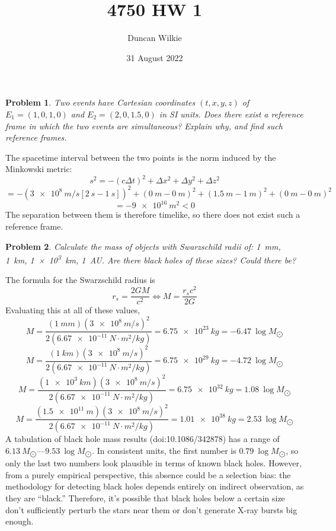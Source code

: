 \documentclass{article}
\title{4750 HW 1}
\author{Duncan Wilkie}
\date{31 August 2022}
\newtheorem{prob}{Problem}
\begin{document}
\maketitle

\begin{prob}
  Two events have Cartesian coordinates $(t,x,y,z)$ of $E_{1}=(1, 0, 1, 0)$ and $E_{2}=(2, 0, 1.5, 0)$ in SI units.
  Does there exist a reference frame in which the two events are simultaneous?
  Explain why, and find such reference frames.
\end{prob}

The spacetime interval between the two points is the norm induced by the Minkowski metric:
\[
  s^{2}= -(c\Delta t)^{2}+\Delta x^{2} + \Delta y^{2} + \Delta z^{2}
\]
\[
  =-(\SI{3e8}{m/s}[\SI{2}{s}-\SI{1}{s}])^{2}+(\SI{0}{m}-\SI{0}{m})^{2}+(\SI{1.5}{m}-\SI{1}{m})^{2}+(\SI{0}{m}-\SI{0}{m})^{2}
\]
\[
  =\SI{-9e16}{m^{2}} < 0
\]
The separation between them is therefore timelike, so there does not exist such a reference frame.

\begin{prob}
  Calculate the mass of objects with Swarzschild radii of: \SI{1}{mm}, \SI{1}{km}, \SI{1e3}{km}, \SI{1}{AU}.
  Are there black holes of these sizes?
  Could there be?

\end{prob}
The formula for the Swarzschild radius is
\[
  r_{s}=\frac{2GM}{c^{2}}\Leftrightarrow M = \frac{r_{s}c^{2}}{2G}
\]
Evaluating this at all of these values,
\[
  M = \frac{(\SI{1}{mm})(\SI{3e8}{m/s})^{2}}{2(\SI{6.67e-11}{N\cdot m^{2}/kg})} = \SI{6.75e23}{kg} = \SI{-6.47}{\log M_{\bigodot}}
\]
\[
  M = \frac{(\SI{1}{km})(\SI{3e8}{m/s})^{2}}{2(\SI{6.67e-11}{N\cdot m^{2}/kg})} = \SI{6.75e29}{kg} = \SI{-4.72}{\log M_{\bigodot}}
\]
\[
  M = \frac{(\SI{1e3}{km})(\SI{3e8}{m/s})^{2}}{2(\SI{6.67e-11}{N\cdot m^{2}/kg})} = \SI{6.75e32}{kg} = \SI{1.08}{\log M_{\bigodot}}
\]
\[
  M = \frac{(\SI{1.5e11}{m})(\SI{3e8}{m/s})^{2}}{2(\SI{6.67e-11}{N\cdot m^{2}/kg})} = \SI{1.01e38}{kg} = \SI{2.53}{\log M_{\bigodot}}
\]
A tabulation of black hole mass results (doi:10.1086/342878) has a range of $\SI{6.13}{M_{\bigodot}}$—$\SI{9.53}{\log M_{\bigodot}}$.
In consistent units, the first number is $\SI{0.79}{\log M_{\bigodot}}$, so only the last two numbers look plausible in terms of known black holes.
However, from a purely empirical perspective, this absence could be a selection bias:
the methodology for detecting black holes depends entirely on indirect observation, as they are ``black.''
Therefore, it's possible that black holes below a certain size don't sufficiently perturb the stars near them or don't generate X-ray bursts big enough.
\end{document}
